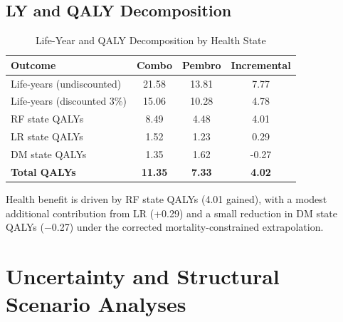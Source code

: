 \documentclass[11pt,a4paper]{article}
\begin{document}
\subsection{LY and QALY Decomposition}
\label{sec:qaly_decomp}
\begin{table}[H]
\centering
\caption{Life-Year and QALY Decomposition by Health State}
\label{tab:s10}
\begin{tabular}{lccc}
\toprule
\textbf{Outcome} & \textbf{Combo} & \textbf{Pembro} & \textbf{Incremental} \\
\midrule
Life-years (undiscounted) & 21.58 & 13.81 & 7.77 \\
Life-years (discounted 3\%) & 15.06 & 10.28 & 4.78 \\
\midrule
RF state QALYs & 8.49 & 4.48 & 4.01 \\
LR state QALYs & 1.52 & 1.23 & 0.29 \\
DM state QALYs & 1.35 & 1.62 & -0.27 \\
\midrule
\textbf{Total QALYs} & \textbf{11.35} & \textbf{7.33} & \textbf{4.02} \\
\bottomrule
\end{tabular}
\end{table}
\noindent Health benefit is driven by RF state QALYs (4.01 gained), with a modest additional contribution from LR (+0.29) and a small reduction in DM state QALYs ($-$0.27) under the corrected mortality-constrained extrapolation.

\section{Uncertainty and Structural Scenario Analyses}
\end{document}
